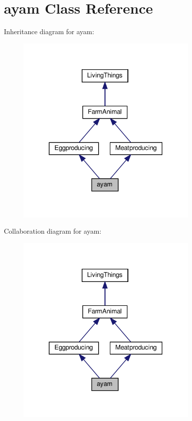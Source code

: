 \hypertarget{classayam}{}\section{ayam Class Reference}
\label{classayam}


Inheritance diagram for ayam\+:
\nopagebreak
\begin{figure}[H]
\begin{center}
\leavevmode
\includegraphics[width=254pt]{classayam__inherit__graph}
\end{center}
\end{figure}


Collaboration diagram for ayam\+:
\nopagebreak
\begin{figure}[H]
\begin{center}
\leavevmode
\includegraphics[width=254pt]{classayam__coll__graph}
\end{center}
\end{figure}
